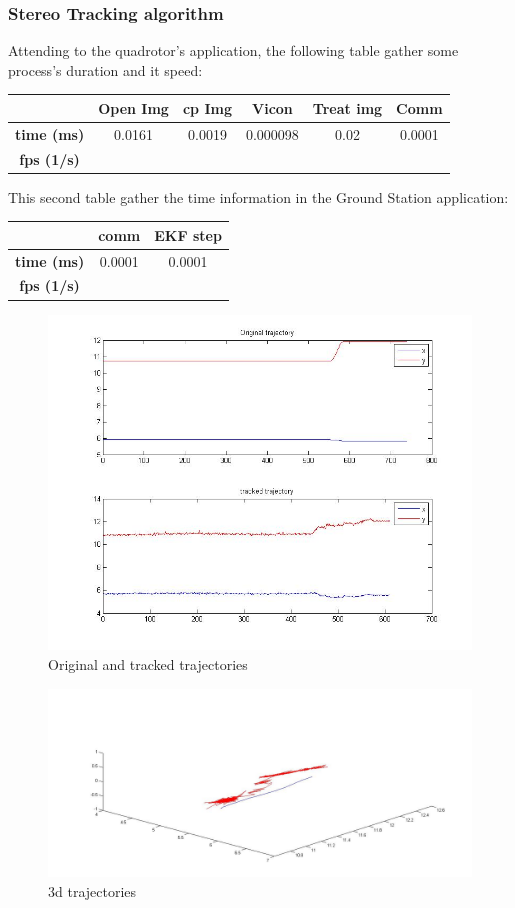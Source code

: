 	\subsubsection{Stereo Tracking algorithm}
		Attending to the quadrotor's application, the following table gather some process's duration and it speed:
		\newline
		\newline
		{
		\centering
			\begin{tabular}{|c|c|c|c|c|c|}
			\hline  					&  Open Img	&  cp Img 	& Vicon 	& Treat img & Comm  		\\ 
			\hline  \textbf{time (ms)}	& 	0.0161	& 0.0019&	0.000098	&  	 0.02	&	0.0001		\\ 
			\hline  \textbf{fps (1/s)}	&  			&  		&  	&  		&			\\ 
			\hline 
			\end{tabular} 
		}
		\newline
		
		This second table gather the time information in the Ground Station application:
		\newline
		
		{
		\centering
			\begin{tabular}{|c|c|c|}
			\hline  					&  comm		&  EKF step	\\
			\hline  \textbf{time (ms)}	& 	0.0001	& 	0.0001	\\
			\hline  \textbf{fps (1/s)}	&  		&  		\\
			\hline 
			\end{tabular} 
		}
		\newline
	\begin{figure}[ph]
		\centering
		\includegraphics[width=0.7\linewidth]{../Images/c4/arch_trajs_stero}
		\caption{Original and tracked trajectories}
		\label{fig:arch_trajs_stero}
	\end{figure}
	
	\begin{figure}[ph]
		\centering
		\includegraphics[width=0.6\linewidth]{../Images/c4/arch_3d_trajs_stero}
		\caption{3d trajectories}
		\label{fig:arch_3d_trajs_stero}
	\end{figure}
